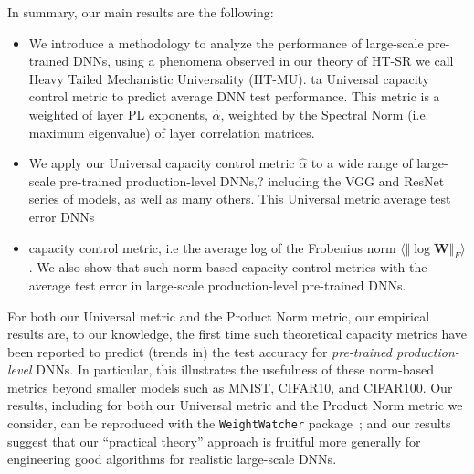 In summary, our main results are the following:


\begin{itemize}
\item
We introduce a  methodology to analyze the performance of large-scale pre-trained DNNs,
using a phenomena observed in our theory of HT-SR we call Heavy Tailed Mechanistic Universality (HT-MU).
 ta Universal capacity control metric to predict average DNN test performance.
This metric is a weighted  of layer PL exponents, $\hat{\alpha}$, weighted by the Spectral Norm
(i.e. maximum eigenvalue) of layer correlation matrices. 
\item
We apply our Universal capacity control metric $\hat{\alpha}$ to a wide range of large-scale pre-trained production-level DNNs,?
 including the VGG and ResNet series of models, as well as many others.
This Universal metric  average test error  DNNs
\item
{} capacity control metric, i.e
the average log of the Frobenius norm $\langle\Vert\log\mathbf{W}\Vert_{F}\rangle$.
We also show that
such norm-based capacity control metrics  with the average test error in large-scale production-level pre-trained DNNs.
\end{itemize}



For both our Universal metric and the Product Norm metric, our empirical results are, to our knowledge, the first time such theoretical capacity metrics have been reported to predict (trends in) the test accuracy for \emph{pre-trained production-level} DNNs.
In particular, this illustrates the usefulness of these norm-based metrics beyond smaller models such as MNIST, CIFAR10, and CIFAR100. 
Our 
results, including for both our Universal metric and the Product Norm metric we consider, can be reproduced with the \texttt{WeightWatcher} package~\cite{weightwatcher_pagkage}; and our
results suggest that our ``practical theory'' approach is fruitful more generally for engineering good algorithms for realistic large-scale DNNs.


